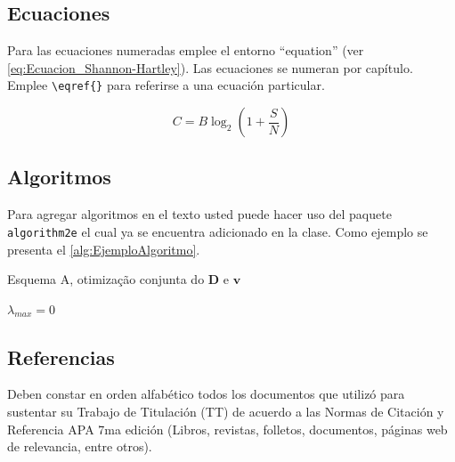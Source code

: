 \subsection{Ecuaciones}
Para las ecuaciones numeradas emplee el entorno ``equation'' (ver \eqref{eq:Ecuacion_Shannon-Hartley}). Las ecuaciones se numeran por capítulo. Emplee  \lstinline|\eqref{}| para referirse a una ecuación particular.  

\begin{equation}\label{eq:Ecuacion_Shannon-Hartley}
C = B \log_{2} \left( 1 + \frac{S}{N} \right) 
\end{equation}

\subsection{Algoritmos}

Para agregar algoritmos en el texto usted puede hacer uso del paquete \lstinline|algorithm2e| el cual ya se encuentra adicionado en la clase. Como ejemplo se presenta el \autoref{alg:EjemploAlgoritmo}. 


\begin{algorithm}[]
	\caption{Esquema A, otimização conjunta do $\mathbf{D}$ e $ \mathbf{v} $}
	\label{alg:EjemploAlgoritmo}
	
	$ \lambda_{max} = 0 $\;
\end{algorithm} 



\subsection{Referencias}
\label{sec:Bibliografia}
Deben constar en orden alfabético todos los documentos que utilizó para sustentar su Trabajo de Titulación (TT) de acuerdo a las Normas de Citación y Referencia APA 7ma edición (Libros, revistas, folletos, documentos, páginas web de relevancia, entre otros). 

